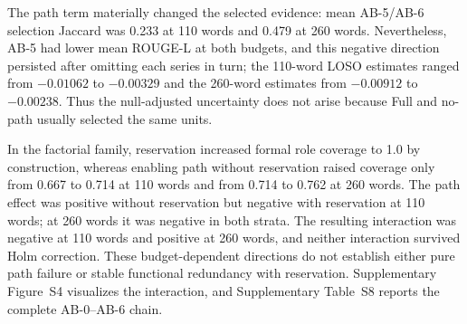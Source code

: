 \documentclass[information,article,submit,moreauthors]{Definitions/mdpi}
\begin{document}
\begin{table}[H]
\caption{Exploratory component-factorial results over seven post-access report series. The primary path-component contrast is normalized Full (AB-5) versus no-path (AB-6). R-L is ROUGE-L F1, Red. is redundancy, Role is role-group coverage, and Edge is typed-edge coverage. Coverage measures formal heuristic structure, not human-validated semantic correctness.}
\label{tab:factorial-main}\centering\scriptsize
{}
\end{table}

The path term materially changed the selected evidence: mean AB-5/AB-6 selection Jaccard was 0.233 at 110 words and 0.479 at 260 words. Nevertheless, AB-5 had lower mean ROUGE-L at both budgets, and this negative direction persisted after omitting each series in turn; the 110-word LOSO estimates ranged from $-0.01062$ to $-0.00329$ and the 260-word estimates from $-0.00912$ to $-0.00238$. Thus the null-adjusted uncertainty does not arise because Full and no-path usually selected the same units.

In the factorial family, reservation increased formal role coverage to 1.0 by construction, whereas enabling path without reservation raised coverage only from 0.667 to 0.714 at 110 words and from 0.714 to 0.762 at 260 words. The path effect was positive without reservation but negative with reservation at 110 words; at 260 words it was negative in both strata. The resulting interaction was negative at 110 words and positive at 260 words, and neither interaction survived Holm correction. These budget-dependent directions do not establish either pure path failure or stable functional redundancy with reservation. Supplementary Figure~S4 visualizes the interaction, and Supplementary Table~S8 reports the complete AB-0--AB-6 chain.
\end{document}
